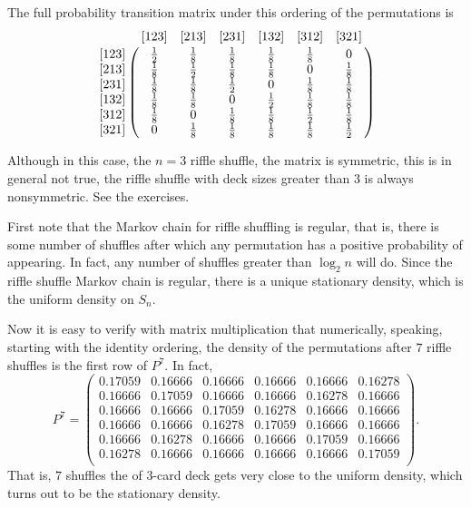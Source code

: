\documentclass[12pt]{article}
\begin{document}
\begin{example}
    The full probability transition matrix under this ordering of the
    permutations is
    \[
        \bordermatrix{
            & [123]      & [213]      & [231]       & [132]       & [312]       & [321] \cr
       [123]& \frac{1}{2}& \frac{1}{8}& \frac{1}{8} & \frac{1}{8} & \frac{1}{8} & 0 \cr
       [213]& \frac{1}{8}& \frac{1}{2}& \frac{1}{8} & \frac{1}{8} & 0           & \frac{1}{8} \cr
       [231]& \frac{1}{8}& \frac{1}{8}& \frac{1}{2} & 0           & \frac{1}{8} & \frac{1}{8} \cr
       [132]& \frac{1}{8}& \frac{1}{8}& 0           & \frac{1}{2} & \frac{1}{8} & \frac{1}{8} \cr
       [312]& \frac{1}{8}& 0          & \frac{1}{8} & \frac{1}{8} & \frac{1}{2} & \frac{1}{8} \cr
       [321]& 0          & \frac{1}{8}& \frac{1}{8} & \frac{1}{8} & \frac{1}{8} & \frac{1}{2} \cr
        }
    \]

    Although in this case, the \( n=3 \) riffle shuffle, the matrix is
    symmetric, this is in general not true, the riffle shuffle with deck
    sizes greater than \( 3 \) is always nonsymmetric.  See the exercises.
\end{example}

First note that the Markov chain for riffle shuffling is regular, that
is, there is some number of shuffles after which any permutation has a
positive probability of appearing.  In fact, any number of shuffles
greater than \( \log_2 n \) will do.  Since the riffle shuffle Markov
chain is regular, there is a unique stationary density, which is the
uniform density on \( S_n \).

Now it is easy to verify with matrix multiplication that numerically,
speaking, starting with the identity ordering, the density of the
permutations after \( 7 \) riffle shuffles is the first row of \( P^7 \).
In fact,
\[
    P^7 =
    \begin{pmatrix}
        0.17059 & 0.16666       & 0.16666       & 0.16666       &
        0.16666 & 0.16278 \\
        0.16666 & 0.17059       & 0.16666       & 0.16666       &
        0.16278 & 0.16666 \\
        0.16666 & 0.16666       & 0.17059       & 0.16278       &
        0.16666 & 0.16666 \\
        0.16666 & 0.16666       & 0.16278       & 0.17059       &
        0.16666 & 0.16666 \\
        0.16666 & 0.16278       & 0.16666       & 0.16666       &
        0.17059 & 0.16666 \\
        0.16278 & 0.16666       & 0.16666       & 0.16666       &
        0.16666 & 0.17059 \\
    \end{pmatrix}
    .
\] That is, \( 7 \) shuffles the of 3-card deck gets very close to the
uniform density, which turns out to be the stationary density.
\end{document}
